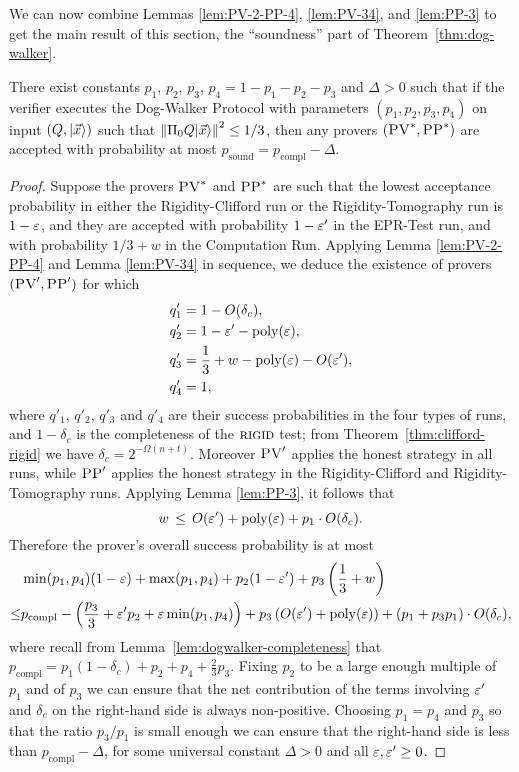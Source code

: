 We can now combine Lemmas \ref{lem:PV-2-PP-4}, \ref{lem:PV-34}, and \ref{lem:PP-3} to get the main result of this section, the ``soundness'' part of Theorem~\ref{thm:dog-walker}.

\begin{lemma}\label{lem:dogwalker-soundness}
 There exist constants $p_1$, $p_2$, $p_3$, $p_4=1-p_1-p_2-p_3$ and $\Delta>0$ such that if the verifier executes the Dog-Walker Protocol with parameters $(p_1,p_2,p_3,p_4)$ on input $(Q,|\vec{x}\rangle)$ such that $\left\|\Pi_0 Q|\vec{x}\rangle\right\|^2\leq 1/3$, then any provers $(\textsc{PV}^*,\textsc{PP}^*)$ are accepted with probability at most $p_{\mathrm{sound}}=p_{\mathrm{compl}}-\Delta$. 
\end{lemma}

\begin{proof}
Suppose the provers $\textsc{PV}^*$ and $\textsc{PP}^*$ are such that the lowest acceptance probability in either the Rigidity-Clifford run or the Rigidity-Tomography run is $1- \varepsilon$, and they are accepted with probability $1-\varepsilon'$ in the EPR-Test run, and with probability $1/3+w$ in the Computation Run. Applying  Lemma \ref{lem:PV-2-PP-4} and Lemma \ref{lem:PV-34} in sequence, we deduce the existence of provers $(\textsc{PV}',\textsc{PP}')$ for which
\begin{align*}
q_1' &= 1- O(\delta_c), \\  q_2' &= 1-\varepsilon'- \operatorname{poly}(\varepsilon), \\ q_3' &= \frac13+w-
  \operatorname{poly}(\varepsilon)-O(\varepsilon'),\\ q_4' &= 1,
\end{align*}
where $q'_1$, $q'_2$, $q'_3$ and $q'_4$ are their success probabilities in the
  four types of runs, and $1-\delta_c$ is the completeness of the
  $\textsc{rigid}$ test; from Theorem~\ref{thm:clifford-rigid} we have $\delta_c = 2^{-\Omega(n+t)}$. Moreover $\textsc{PV}'$ applies the honest strategy in all runs, while $\textsc{PP}'$ applies the honest strategy in the Rigidity-Clifford and Rigidity-Tomography runs. Applying Lemma \ref{lem:PP-3}, it follows that 
$$w \,\leq\, O(\varepsilon') + \operatorname{poly}(\varepsilon) +p_1 \cdot O(\delta_c).$$
Therefore the prover's overall success probability is at most 
\begin{align*}
& \min(p_1,p_4)(1-\varepsilon)+\max(p_1,p_4) + p_2(1-\varepsilon')+p_3\left(\frac{1}{3}+w\right) \\
\leq & p_{\mathrm{compl}} - \left( \frac{p_3}{3} + \varepsilon' p_2+\varepsilon\min(p_1,p_4)\right)+ p_3\left(O(\varepsilon')+\operatorname{poly}(\varepsilon)\right)+ (p_1 + p_3p_1) \cdot O(\delta_c),
\end{align*}
where recall from Lemma~\ref{lem:dogwalker-completeness} that
  $p_{\mathrm{compl}} =  p_1(1-\delta_c)+p_2+p_4+\frac{2}{3}p_3$. Fixing $p_2$
  to be a large enough multiple of $p_1$ and of $p_3$ we can ensure that the net contribution
  of the terms involving $\varepsilon'$ and $\delta_c$ on the right-hand side is always
  non-positive. Choosing $p_1=p_4$ and $p_3$ so that the ratio $p_3/p_1$ is small
  enough we can ensure that the right-hand side is less than $p_{\mathrm{compl}}
  -\Delta$, for some universal constant $\Delta>0$ and all $\varepsilon,\varepsilon'\geq 0$.
\end{proof}

